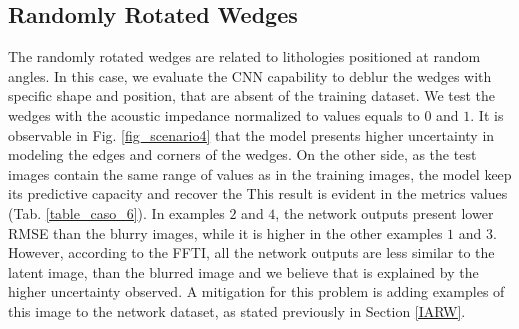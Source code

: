\documentclass[conference]{IEEEtran}
\begin{document}
\subsection{Randomly Rotated Wedges}
The randomly rotated wedges are related to lithologies positioned at random angles.
In this case, we evaluate the CNN capability to deblur the wedges with specific shape and
position, that are absent of the training dataset.
We test the wedges with the acoustic impedance normalized to values equals to $0$ and $1$.
It is observable in Fig. \ref{fig_scenario4} that the model presents higher uncertainty
in modeling the edges and corners of the wedges. On the other side, as the test images contain the same range of values
as in the training images, the model keep its predictive capacity and recover the  This result is evident in the metrics values
(Tab. \ref{table_caso_6}). In examples $2$ and $4$, the network outputs present lower RMSE than the blurry images, 
while it is higher in the other examples $1$ and $3$. However, according to the FFTI, all the network outputs are
less similar to the latent image, than the blurred image and we believe that is explained by the higher uncertainty
observed. A mitigation for this problem is adding examples of this image to the network dataset, as stated previously in
Section \ref{IARW}.
\end{document}
